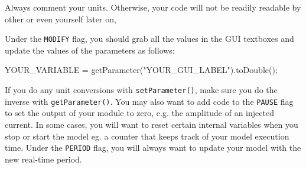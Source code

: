\attention Always comment your units. Otherwise, your code will not be readily readable by other or even yourself later on, 

Under the \texttt{MODIFY} flag, you should grab all the values in the GUI textboxes and update the values of the parameters as follows:
\begin{example}
YOUR\_VARIABLE = getParameter("YOUR\_GUI\_LABEL").toDouble();
\end{example}

If you do any unit conversions with \texttt{setParameter()}, make sure you do the inverse with \texttt{getParameter()}. You may also want to add code to the \texttt{PAUSE} flag to set the output of your module to zero, e.g. the amplitude of an injected current. \attention In some cases, you will want to reset certain internal variables when you stop or start the model eg. a counter that keeps track of your model execution time. Under the \texttt{PERIOD} flag, you will always want to update your model with the new real-time period. 

